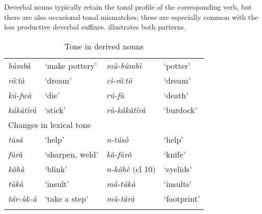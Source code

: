\begin{table}
\label{bkm:Ref463014744}\caption{\label{tab:4:6}Deverbal suffixes}
\end{table}

Deverbal nouns typically retain the tonal profile of the corresponding verb, but there are also occasional tonal mismatches; these are especially common with the less productive deverbal suffixes.  illustrates both patterns.

\begin{table}
\label{bkm:Ref74564279}\caption{\label{tab:4:7}Tone in derived nouns}
\begin{tabularx}{\textwidth}{XXXl}
\lsptoprule
\multicolumn{4}{l}{Maintenance of lexical tone}\\
\midrule
\textit{bûmbà} & ‘make pottery’ & \textit{mù-bûmbì} & ‘potter’\\
\textit{rôːtà} & ‘dream’ & \textit{cì-rôːtò} & ‘dream’\\
\textit{kú-fwà} & ‘die’ & \textit{rú-fù} & ‘death’\\
\textit{kákàtìrà} & ‘stick’ & \textit{rù-kákàtìrà} & ‘burdock’\\
\midrule
\multicolumn{4}{l}{Changes in lexical tone}\\
\midrule
\textit{tùsà} & ‘help’ & \textit{n-túsò} & ‘help’\\
\textit{fûrà} & ‘sharpen, weld’ & \textit{kà-fùrò} & ‘knife’\\
\textit{kòhà} & ‘blink’ & \textit{n-kôhè} (cl 10) & ‘eyelids’\\
\textit{tùkà} & ‘insult’ & \textit{mà-tûkà} & ‘insults’\\
\textit{tár-ùk-à} & ‘take a step’ & \textit{mù-tàrà} & ‘footprint’\\
\lspbottomrule
\end{tabularx}
\end{table}

